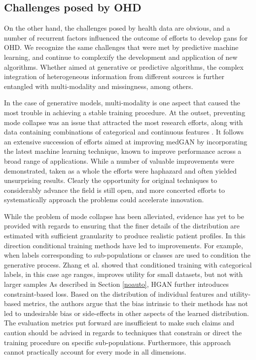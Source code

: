\subsection{Challenges posed by OHD}
On the other hand, the challenges posed by health data are obvious, and a number of recurrent factors influenced the outcome of efforts to develop \glspl{gan} for OHD. We recognize the same challenges that were met by predictive machine learning, and continue to complexify the development and application of new algorithms. Whether aimed at generative or predictive algorithms, the complex integration of  heterogeneous information from different sources is further entangled with multi-modality and missingness, among others.\par
In the case of generative models, multi-modality is one aspect that  caused the most trouble in achieving a stable training procedure. At the outset, preventing mode collapse was an issue that attracted the most research efforts, along with data containing combinations of categorical and continuous features . It follows an extensive succession of efforts aimed at improving medGAN by incorporating the latest machine learning technique, known to improve performance across a broad range of applications. While a number of valuable improvements were demonstrated, taken as a whole the efforts were haphazard and often yielded unsurprising results. Clearly the opportunity for original techniques to considerably advance the field is still open, and more concerted efforts to systematically approach the problems could accelerate innovation.\par
While the problem of mode collapse has been alleviated, evidence has yet to be provided with regards to ensuring that the finer details of the distribution are estimated with sufficient granularity to produce realistic patient profiles. In this direction conditional training methods have led to improvements. For example, when labels corresponding to sub-populations or classes are used to condition the generative process. Zhang et al. showed that conditioned training with categorical labels, in this case age ranges, improves utility for small datasets, but not with larger samples \cite{Zhang2020} As described in Section \ref{noauto}, HGAN further introduces constraint-based loss. Based on the distribution of individual features and utility-based metrics, the authors argue that the bias intrinsic to their methods has not led to undesirable bias or side-effects in other aspects of the learned distribution. The evaluation metrics put forward are insufficient to make such claims and caution should be advised in regards to techniques that constrain or direct the training procedure on specific sub-populations. Furthermore, this approach cannot practically account for every mode in all dimensions.

